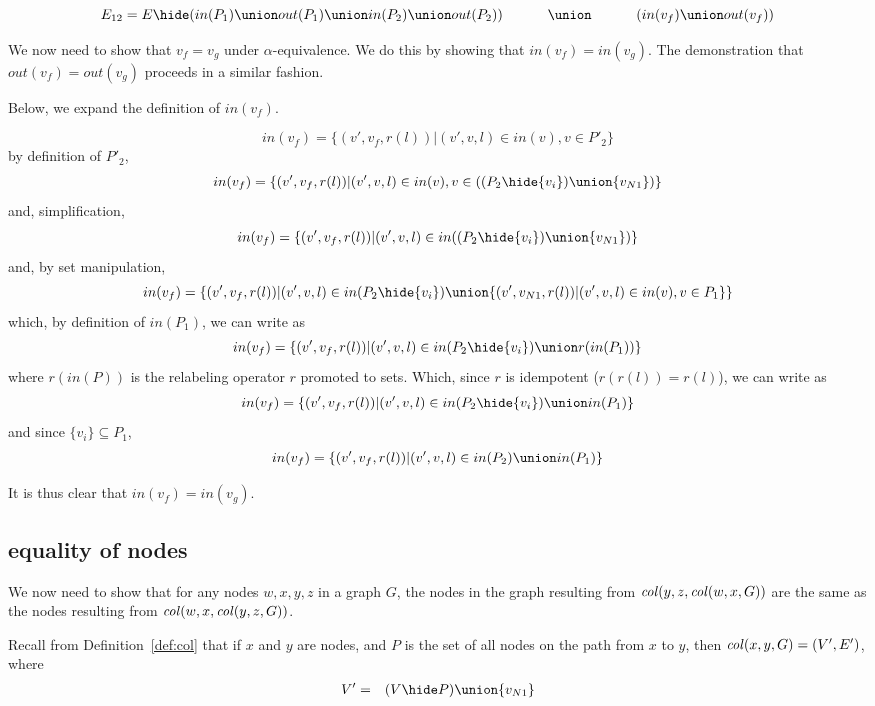 \[
E_{12}  =  
   E\hide
  (
    in(P_1) \union out(P_1) \union in(P_2) \union out(P_2)
  ) \\
   \hphantom{E_{12}  = \;\;}   \union\ \\
\hphantom{E_{12}  = \;\;}   (in(v_f) \union out(v_f))\\ 
\]


We now need to show that $v_f=v_g$ under $\alpha$-equivalence. We do this by showing that $in(v_f)=in(v_g)$. The demonstration that $out(v_f)=out(v_g)$ proceeds in a similar fashion. 

Below, we expand the definition of $in(v_f)$. 

\[
in(v_f) = \{(v',v_f,r(l))|(v',v,l) \in in(v), v\in P'_2\}
\]
\noindent
by definition of $P'_2$,
\[
in(v_f) = \{(v',v_f,r(l))|(v',v,l) \in in(v), v\in((P_2\hide\{v_i\})\union\{v_{N1}\})\}
\]
\noindent
and,  simplification, 
\[
in(v_f) = \{(v',v_f,r(l))|(v',v,l) \in in((P_2\hide\{v_i\}) \union \{v_{N1}\})\}
\]
\noindent
and, by set manipulation, 
\[
in(v_f) = \{(v',v_f,r(l))|(v',v,l) \in in(P_2\hide\{v_i\}) \union  \{(v',v_{N1},r(l))|(v',v,l)\in in(v), v\in P_1\}\}
\]
\noindent
which, by definition of $in(P_1)$, we can write as
\[
in(v_f) = \{(v',v_f,r(l))|(v',v,l) \in in(P_2\hide\{v_i\}) \union  r(in(P_1))\}
\]
\noindent
where $r(in(P))$ is the relabeling operator $r$ promoted to sets.  Which, since $r$ is idempotent ($r(r(l)) = r(l)$), we can write as
\[
in(v_f) = \{(v',v_f,r(l))|(v',v,l) \in in(P_2\hide\{v_i\}) \union  in(P_1)\}
\]
\noindent
and since $\{v_i\} \subseteq P_1$, 
\[
in(v_f) = \{(v',v_f,r(l))|(v',v,l) \in in(P_2) \union  in(P_1)\}
\]



It is thus clear that $in(v_f)=in(v_g)$. 


\subsection{equality of nodes}

 We now need to show that for any nodes $w,x,y,z$ in a graph $G$, the nodes in the graph resulting from $\mathit{col}(y,z,\mathit{col}(w,x,G))$ are the same as the nodes resulting from $\mathit{col}(w,x,\mathit{col}(y,z,G))$. 

Recall from Definition~\ref{def:col} that if $x$ and $y$ are nodes, and $P$ is the set of all nodes on the path from $x$ to $y$, then  $\mathit{col}(x,y,G) =  (V',E')$, where 
  \begin{eqnarray*}
  V' & = & (V\hide P) \union \{v_{N1}\}     \\
  \end{eqnarray*}


